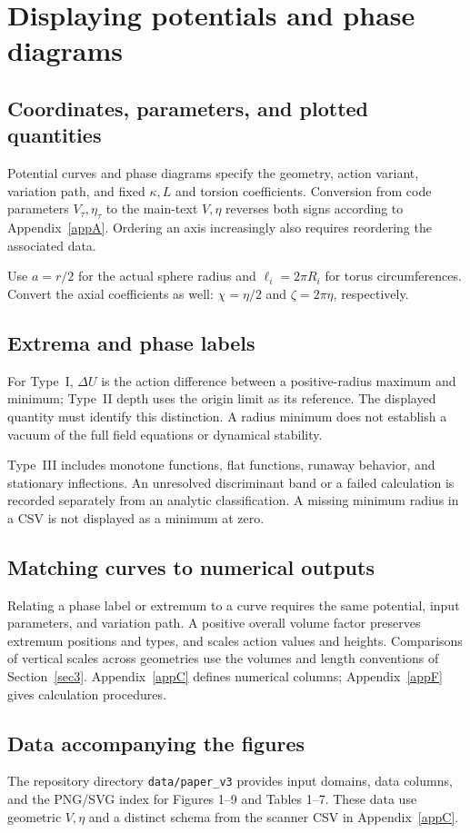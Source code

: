 \section{Displaying potentials and phase diagrams}\label{appD}
\subsection{Coordinates, parameters, and plotted quantities}
Potential curves and phase diagrams specify the geometry, action variant,
variation path, and fixed $\kappa,L$ and torsion coefficients.
Conversion from code parameters $V_\tau,\eta_\tau$ to the main-text
$V,\eta$ reverses both signs according to Appendix~\ref{appA}.
Ordering an axis increasingly also requires reordering the associated data.

Use $a=r/2$ for the actual sphere radius and $\ell_i=2\pi R_i$
for torus circumferences. Convert the axial coefficients as well:
$\chi=\eta/2$ and $\zeta=2\pi\eta$, respectively.

\subsection{Extrema and phase labels}
For Type~I, $\Delta U$ is the action difference between a positive-radius
maximum and minimum; Type~II depth uses the origin limit as its reference.
The displayed quantity must identify this distinction.
A radius minimum does not establish a vacuum of the full field equations
or dynamical stability.

Type~III includes monotone functions, flat functions, runaway behavior,
and stationary inflections.
An unresolved discriminant band or a failed calculation is recorded
separately from an analytic classification.
A missing minimum radius in a CSV is not displayed as a minimum at zero.

\subsection{Matching curves to numerical outputs}
Relating a phase label or extremum to a curve requires the same potential,
input parameters, and variation path.
A positive overall volume factor preserves extremum positions and types,
and scales action values and heights.
Comparisons of vertical scales across geometries use the volumes and
length conventions of Section~\ref{sec3}.
Appendix~\ref{appC} defines numerical columns; Appendix~\ref{appF}
gives calculation procedures.

\subsection{Data accompanying the figures}
The repository directory \texttt{data/paper\_v3} provides input domains, data columns, and the PNG/SVG index for Figures 1--9 and Tables 1--7. These data use geometric $V,\eta$ and a distinct schema from the scanner CSV in Appendix~\ref{appC}.
